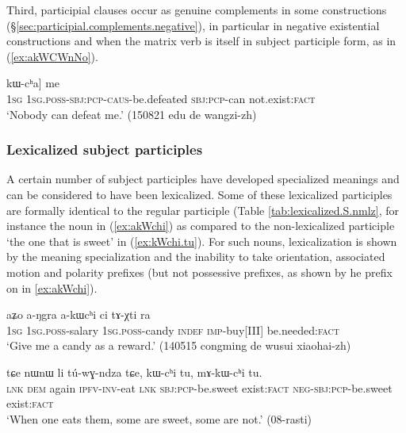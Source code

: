 Third, participial clauses occur as genuine complements in some constructions (§\ref{sec:participial.complements.negative}), in particular in negative existential constructions and when the matrix verb is itself in subject participle form, as in (\ref{ex:akWCWnNo}).

\begin{exe}
\ex \label{ex:akWCWnNo}
\gll  [[aʑo a-kɯ-ɕɯ-nŋo] kɯ-cʰa] me  \\
\textsc{1sg} \textsc{1sg}.\textsc{poss}-\textsc{sbj}:\textsc{pcp}-\textsc{caus}-be.defeated \textsc{sbj}:\textsc{pcp}-can not.exist:\textsc{fact} \\
 \glt `Nobody can defeat me.' (150821 edu de wangzi-zh) 
 \end{exe}
 
\subsubsection{Lexicalized subject participles} \label{sec:lexicalized.subject.participle}
A certain number of subject participles have developed specialized meanings and can be considered to have been lexicalized. Some of these lexicalized participles are formally identical to the regular participle (Table  \ref{tab:lexicalized.S.nmlz}, for instance the noun  in (\ref{ex:akWchi})  as compared to the non-lexicalized participle  `the one that is sweet' in (\ref{ex:kWchi.tu}). For such nouns, lexicalization is shown by the meaning specialization and the inability to take orientation, associated motion and polarity prefixes (but not possessive prefixes, as shown by he prefix  on  in \ref{ex:akWchi}).

\begin{exe}
\ex \label{ex:akWchi}
 \gll aʑo a-ŋgra a-kɯcʰi ci tɤ-χti ra \\
 \textsc{1sg} \textsc{1sg}.\textsc{poss}-salary \textsc{1sg}.\textsc{poss}-candy \textsc{indef} \textsc{imp}-buy[III] be.needed:\textsc{fact} \\
\glt `Give me a candy as a reward.' (140515 congming de wusui xiaohai-zh) 
\end{exe}

\begin{exe}
\ex \label{ex:kWchi.tu}
 \gll tɕe nɯnɯ li tú-wɣ-ndza tɕe, kɯ-cʰi tu, mɤ-kɯ-cʰi tu. \\
\textsc{lnk} \textsc{dem} again \textsc{ipfv}-\textsc{inv}-eat \textsc{lnk} \textsc{sbj}:\textsc{pcp}-be.sweet exist:\textsc{fact} \textsc{neg}-\textsc{sbj}:\textsc{pcp}-be.sweet exist:\textsc{fact} \\
\glt `When one eats them, some are sweet, some are not.' (08-rasti)
\end{exe}

